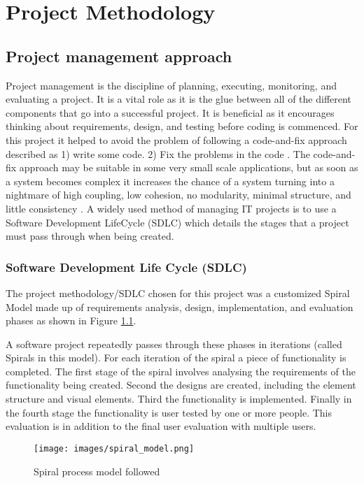 
\chapter{Project Methodology}\label{C:m}

\section{Project management approach}
Project management is the discipline of planning, executing, monitoring, and
evaluating a project. It is a vital role as it is the glue between all of the
different components that go into a successful project. It is beneficial as it
encourages thinking about requirements, design, and testing before coding is
commenced. For this project it helped to avoid the problem of following a
code-and-fix approach described  as 1) write some code. 2) Fix the problems in
the code \cite{boehm1988spiral}. The code-and-fix approach may be suitable in some very
small scale applications, but as soon as a system becomes complex it increases
the chance of a system turning into a nightmare of high coupling, low cohesion,
no modularity, minimal structure, and little consistency \cite{foote1997big}.
A widely used method of managing IT projects is to use a Software Development
LifeCycle (SDLC) which details the stages that a project must pass through  when
being created.

\subsection{Software Development Life Cycle (SDLC)}
The project methodology/SDLC chosen for
this project was a customized Spiral Model \cite{boehm1988spiral} made up of
requirements analysis, design, implementation, and evaluation phases as shown in
Figure \ref{fig:spiralModel}. 

A software project repeatedly passes through these phases in iterations (called
Spirals in this model). For each iteration of the spiral a piece of
functionality is completed. The first stage of the spiral involves analysing the
requirements of the functionality being created. Second the designs are created,
including the element structure and visual elements. Third the functionality is
implemented. Finally in the fourth stage the functionality is user tested by one
or more people. This evaluation is in addition to the final user evaluation with
multiple users. 

\begin{figure}[H]
  \centering
      \texttt{[image: images/spiral\_model.png]}
  \caption{Spiral process model followed}
  \label{fig:spiralModel}
\end{figure}

